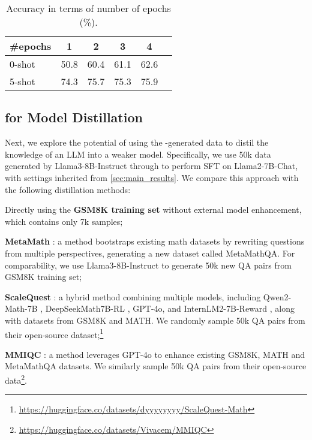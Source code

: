 

\begin{table}[t]
\centering
\caption{Accuracy in terms of number of epochs (\%).}
\label{tab:epochs}
\begin{small}
\begin{tabular}{lccccc}
\toprule
\#epochs & {1} & {2} & {3} & {4}  \\
\midrule
0-shot & 50.8 & 60.4 & 61.1 & 62.6   \\
5-shot & 74.3 & 75.7 & 75.3 & 75.9   \\
\bottomrule
\end{tabular}
\end{small}
\end{table}

\subsection{{\langname} for Model Distillation}

Next, we explore the potential of using the {\langname}-generated data to distil the knowledge of an LLM into a weaker model. Specifically, we use 50k data generated by Llama3-8B-Instruct through {\langname} to perform SFT on Llama2-7B-Chat, with settings inherited from \cref{sec:main_results}. We compare this approach with the following distillation methods:
\begin{enumerate*}[label=(\roman*)]
    \item Directly using the \textbf{GSM8K training set} without external model enhancement, which contains only 7k samples;
    \item \textbf{MetaMath} \cite{DBLP:conf/iclr/YuJSYLZKLWL24}: a method bootstraps existing math datasets by rewriting questions from multiple perspectives, generating a new dataset called MetaMathQA. For comparability, we use Llama3-8B-Instruct to generate 50k new QA pairs from GSM8K training set;
    \item \textbf{ScaleQuest} \cite{DBLP:journals/corr/abs-2410-18693}: a hybrid method combining multiple models, including Qwen2-Math-7B \cite{DBLP:journals/corr/abs-2409-12122}, DeepSeekMath7B-RL \cite{DBLP:journals/corr/abs-2402-03300}, GPT-4o, and InternLM2-7B-Reward \cite{DBLP:journals/corr/abs-2403-17297}, along with datasets from GSM8K and MATH. We randomly sample 50k QA pairs from their open-source dataset;\footnote{\url{https://huggingface.co/datasets/dyyyyyyyy/ScaleQuest-Math}}
    \item \textbf{MMIQC} \cite{DBLP:journals/corr/abs-2401-09003}: a method leverages GPT-4o to enhance existing GSM8K, MATH and MetaMathQA datasets. We similarly sample 50k QA pairs from their open-source data\footnote{\url{https://huggingface.co/datasets/Vivacem/MMIQC}}.
\end{enumerate*}

